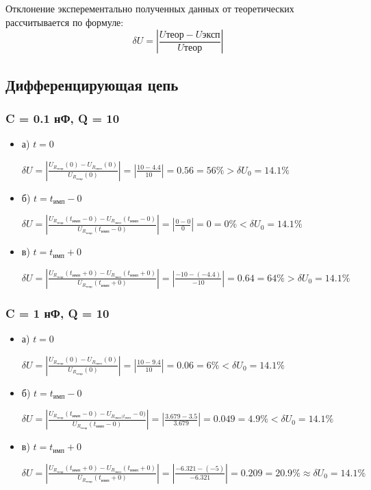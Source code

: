 \documentclass[a4paper,14pt]{extarticle}
\begin{document}
Отклонение эксперементально полученных данных от теоретических рассчитывается по формуле:
\[
\delta U = \left|\frac{U\text{теор}-U\text{эксп}}{U\text{теор}}\right|
\]

\subsection{Дифференцирующая цепь}

\subsubsection{C = 0.1 нФ, Q = 10}

\begin{itemize}
	\item[] а) $t = 0$

	$\delta U = \left| \frac{U_{R_\text{теор}}(0) - U_{R_\text{эксп}}(0)}{U_{R_\text{теор}}(0)} \right| = \left| \frac{10 - 4.4}{10} \right| = 0.56 = 56\% > \delta U_0 = 14.1\%$

	\item[] б) $t = t_\text{имп}-0$

	$\delta U = \left| \frac{U_{R_\text{теор}}(t_\text{имп}-0) - U_{R_\text{эксп}}(t_\text{имп}-0)}{U_{R_\text{теор}}(t_\text{имп}-0)} \right| = \left| \frac{0 - 0}{0} \right| = 0 = 0\% < \delta U_0 = 14.1\%$

	\item[] в)  $t = t_\text{имп}+0$

	$\delta U = \left| \frac{U_{R_\text{теор}}(t_\text{имп}+0) - U_{R_\text{эксп}}(t_\text{имп}+0)}{U_{R_\text{теор}}(t_\text{имп}+0)} \right| = \left| \frac{-10 - (-4.4)}{-10} \right| = 0.64 = 64\% > \delta U_0 = 14.1\%$
\end{itemize}

\subsubsection{C = 1 нФ, Q = 10}

\begin{itemize}
	\item[] а)  $t = 0$

	$\delta U = \left| \frac{U_{R_\text{теор}}(0) - U_{R_\text{эксп}}(0)}{U_{R_\text{теор}}(0)} \right| = \left| \frac{10 - 9.4}{10} \right| = 0.06 = 6\% < \delta U_0 = 14.1\%$

	\item[] б) $t = t_\text{имп}-0$

	$\delta U = \left| \frac{U_{R_\text{теор}}(t_\text{имп}-0) - U_{R_\text{эксп}(t_\text{имп}}-0)}{U_{R_\text{теор}}(t_\text{имп}-0)} \right| = \left| \frac{3.679 - 3.5}{3.679} \right| = 0.049 = 4.9\% < \delta U_0 = 14.1\%$

	\item[] в) $t = t_\text{имп}+0$

	$\delta U = \left| \frac{U_{R_\text{теор}}(t_\text{имп}+0) - U_{R_\text{эксп}}(t_\text{имп}+0)}{U_{R_\text{теор}}(t_\text{имп}+0)} \right| = \left| \frac{-6.321 - (-5)}{-6.321} \right| = 0.209 = 20.9\% \approx \delta U_0 = 14.1\%$
\end{itemize}
\end{document}
